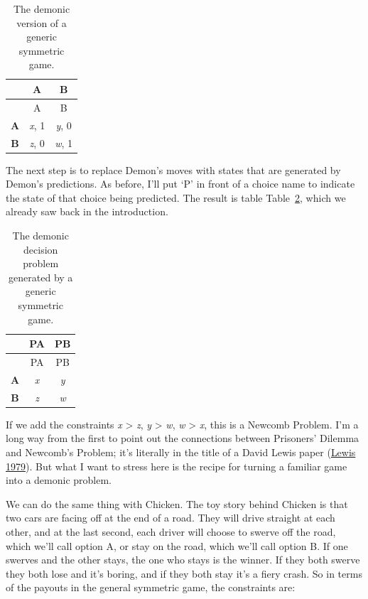\documentclass[
  12pt,
  letterpaper,
  DIV=11,
  numbers=noendperiod]{scrreprt}
\begin{document}
\hypertarget{tbl-demon-sym-game}{}
\begin{longtable}[]{@{}ccc@{}}
\caption{\label{tbl-demon-sym-game}The demonic version of a generic
symmetric game.}\tabularnewline
\toprule\noalign{}
& A & B \\
\midrule\noalign{}
\endfirsthead
\toprule\noalign{}
& A & B \\
\midrule\noalign{}
\endhead
\bottomrule\noalign{}
\endlastfoot
\textbf{A} & \emph{x}, 1 & \emph{y}, 0 \\
\textbf{B} & \emph{z}, 0 & \emph{w}, 1 \\
\end{longtable}

The next step is to replace Demon's moves with states that are generated
by Demon's predictions. As before, I'll put `P' in front of a choice
name to indicate the state of that choice being predicted. The result is
table Table~\ref{tbl-gen-dem-problem}, which we already saw back in the
introduction.

\hypertarget{tbl-gen-dem-problem}{}
\begin{longtable}[]{@{}ccc@{}}
\caption{\label{tbl-gen-dem-problem}The demonic decision problem
generated by a generic symmetric game.}\tabularnewline
\toprule\noalign{}
& PA & PB \\
\midrule\noalign{}
\endfirsthead
\toprule\noalign{}
& PA & PB \\
\midrule\noalign{}
\endhead
\bottomrule\noalign{}
\endlastfoot
\textbf{A} & \emph{x} & \emph{y} \\
\textbf{B} & \emph{z} & \emph{w} \\
\end{longtable}

If we add the constraints \emph{x} \textgreater{} \emph{z}, \emph{y}
\textgreater{} \emph{w}, \emph{w} \textgreater{} \emph{x}, this is a
Newcomb Problem. I'm a long way from the first to point out the
connections between Prisoners' Dilemma and Newcomb's Problem; it's
literally in the title of a David Lewis paper
(\protect\hyperlink{ref-Lewis1979e}{Lewis 1979}). But what I want to
stress here is the recipe for turning a familiar game into a demonic
problem.

We can do the same thing with Chicken. The toy story behind Chicken is
that two cars are facing off at the end of a road. They will drive
straight at each other, and at the last second, each driver will choose
to swerve off the road, which we'll call option A, or stay on the road,
which we'll call option B. If one swerves and the other stays, the one
who stays is the winner. If they both swerve they both lose and it's
boring, and if they both stay it's a fiery crash. So in terms of the
payouts in the general symmetric game, the constraints are:
\end{document}
